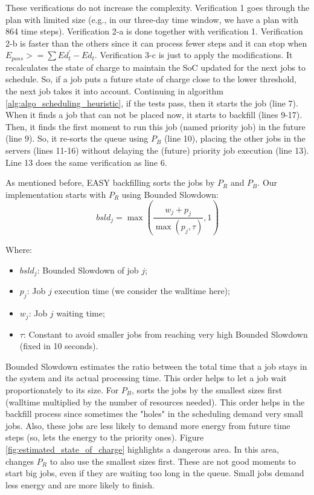 These verifications do not increase the complexity. Verification 1 goes through the plan with limited size (e.g., in our three-day time window, we have a plan with 864 time steps). Verification 2-a is done together with verification 1. Verification 2-b is faster than the others since it can process fewer steps and it can stop when $E_{poss} >= \sum Ed_t^{'} - Ed_t$. Verification 3-c is just to apply the modifications. It recalculates the state of charge to maintain the SoC updated for the next jobs to schedule. So, if a job puts a future state of charge close to the lower threshold, the next job takes it into account. Continuing in algorithm \ref{alg:algo_scheduling_heuristic}, if the tests pass, then it starts the job (line 7). When it finds a job that can not be placed now, it starts to backfill (lines 9-17). Then, it finds the first moment to run this job (named priority job) in the future (line 9). So, it re-sorts the queue using $P_{B}$ (line 10), placing the other jobs in the servers (lines 11-16) without delaying the (future) priority job execution (line 13). Line 13 does the same verification as line 6.

As mentioned before, EASY backfilling sorts the jobs by $P_{R}$ and $P_{B}$. Our implementation starts with $P_{R}$ using Bounded Slowdown:
\begin{equation}
    bsld_j = \max(\frac{w_j + p_j}{\max(p_j, \tau)}, 1)
\end{equation}

Where:
\begin{itemize}
    \item \(bsld_j\): Bounded Slowdown of job \(j\);
    \item \(p_j\): Job \(j\) execution time (we consider the walltime here);
    \item \(w_j\): Job \(j\) waiting time;
    \item \(\tau\): Constant to avoid smaller jobs from reaching very high Bounded Slowdown (fixed in 10 seconds).
\end{itemize}

Bounded Slowdown estimates the ratio between the total time that a job stays in the system and its actual processing time. This order helps to let a job wait proportionately to its size. For $P_{B}$, \emph{\systemName} sorts the jobs by the smallest sizes first (walltime multiplied by the number of resources needed). This order helps in the backfill process since sometimes the "holes" in the scheduling demand very small jobs. Also, these jobs are less likely to demand more energy from future time steps (so, \emph{\systemName} lets the energy to the priority ones). Figure \ref{fig:estimated_state_of_charge} highlights a dangerous area. In this area, \emph{\systemName} changes $P_{R}$ to also use the smallest sizes first. These are not good moments to start big jobs, even if they are waiting too long in the queue. Small jobs demand less energy and are more likely to finish.

